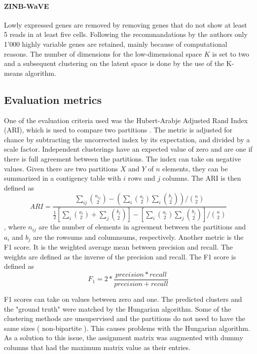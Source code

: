 \documentclass[12pt, a4paper]{article}\usepackage[]{graphicx}\usepackage[]{color}
\begin{document}
\paragraph{ZINB-WaVE}
Lowly expressed genes are removed by removing genes that do not show at least 5 reads in at least five cells. Following the recommandations by the authors only 1'000 highly variable genes are retained, mainly because of computational reasons.  
The number of dimensions for the low-dimensional space $K$ is set to two and a subsequent clustering on the latent space is done by the use of the K-means algorithm.
\newpage
\subsection{Evaluation metrics}
One of the evaluation criteria used was the Hubert-Arabje Adjusted Rand Index (ARI), which is used to compare two partitions \citep{hubert1985comparing}. The metric is adjusted for chance by subtracting the uncorrected index by its expectation, and divided by a scale factor. Independent clusterings have an expected value of zero and are one if there is full agreement between the partitions. The index can take on negative values. Given there are two partitions $X$ and $Y$ of $n$ elements, they can be summarized in a contigency table with $i$ rows and $j$ columns. The ARI is then defined as
\begin{equation}
ARI=\frac{ {\sum_{ij}{n_{ij} \choose 2}-(  \sum_{i}{a_{i} \choose 2}  \sum_{i}{b_{j} \choose 2})}/{n\choose 2}} 
{ \frac{1}{2} [ \sum_{i}{a_{i} \choose 2}+\sum_{j}{b_{j} \choose 2} ]-[\sum_{i}{a_{i} \choose 2}\sum_{j}{b_{j} \choose 2}]/{n\choose 2} }
\end{equation}
, where $n_{ij}$ are the number of elements in agreement between the partitions and $a_{i}$ and $b_{j}$ are the rowsums and columnsums, respectively. 
Another metric is the F1 score. It is the weighted average mean between precision and recall. The weights are defined as the inverse of the precision and recall. The F1 score is defined as
\begin{equation}
F_{1}= 2 * \frac{precision * recall}{precision + recall}
\end{equation}

F1 scores can take on values between zero and one. The predicted clusters and the "ground truth" were matched by the Hungarian algorithm. Some of the clustering methods are unsupervised and the partitions do not need to have the same sizes ( non-bipartite ). This causes problems with the Hungarian algorithm. As a solution to this issue, the assignment matrix was augmented with dummy columns that had the maximum matrix value as their entries.
\end{document}
